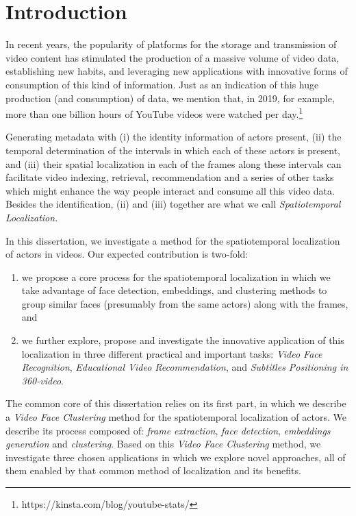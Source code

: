 \newpage

\chapter{Introduction}
\label{chap:introduction}

In recent years, the popularity of platforms for the storage and transmission of video content has stimulated the production of a massive volume of video data, establishing new habits, and leveraging new applications with innovative forms of consumption of this kind of information. Just as an indication of this huge production (and consumption) of data, we mention that, in 2019, for example, more than one billion hours of YouTube videos were watched per day.\footnote{https://kinsta.com/blog/youtube-stats/}


Generating metadata with (i) the identity information of actors present, (ii) the temporal determination of the intervals in which each of these actors is present, and (iii) their spatial localization in each of the frames along these intervals can facilitate video indexing, retrieval, recommendation and a series of other tasks which might enhance the way people interact and consume all this video data. Besides the identification, (ii) and (iii) together are what we call \textit{Spatiotemporal Localization}. 

In this dissertation, we investigate a method for the spatiotemporal localization of actors in videos. Our expected contribution is two-fold: 
\begin{enumerate}
\item we propose a core process for the spatiotemporal localization in which we take advantage of face detection, embeddings, and clustering methods to group similar faces (presumably from the same actors) along with the frames, and \item we further explore, propose and investigate the innovative application of this localization in three different practical and important tasks: \emph{Video Face Recognition}, \emph{Educational Video Recommendation}, and \emph{Subtitles Positioning in 360-video}.  
\end{enumerate}

The common core of this dissertation relies on its first part, in which we describe a \textit{Video Face Clustering} method for the spatiotemporal localization of actors. We describe its process composed of: \textit{frame extraction}, \textit{face detection}, \textit{embeddings generation} and \textit{clustering}. 
Based on this \emph{Video Face Clustering} method, we investigate three chosen applications in which we explore novel approaches, all of them enabled by that common method of localization and its benefits. 


